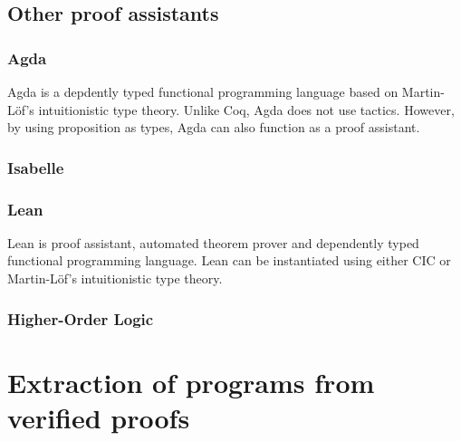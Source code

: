 \subsection{Other proof assistants}

\subsubsection{Agda}

Agda is a depdently typed functional programming language based on Martin-Löf's
intuitionistic type theory. Unlike Coq, Agda does not use tactics. \cite{agdatut}
However, by using proposition as types, Agda can also function as a proof assistant.

\subsubsection{Isabelle}

\subsubsection{Lean}

Lean is proof assistant, automated theorem prover and dependently typed functional programming language.
Lean can be instantiated using either CIC or Martin-Löf's intuitionistic type theory.
\cite{lean}

\subsubsection{Higher-Order Logic}

\section{Extraction of programs from verified proofs}
